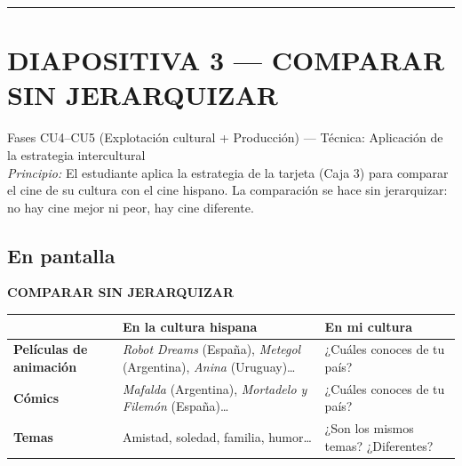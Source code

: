 \documentclass[a4paper,11pt]{article}
\begin{document}
\noindent\textcolor{violeta}{\rule{\linewidth}{2.5pt}}

\section*{DIAPOSITIVA 3 — COMPARAR SIN JERARQUIZAR}

{\small Fases CU4--CU5 (Explotación cultural + Producción) — Técnica: Aplicación de la estrategia intercultural}\\
{\small\textit{Principio:} El estudiante aplica la estrategia de la tarjeta (Caja 3) para comparar el cine de su cultura con el cine hispano. La comparación se hace sin jerarquizar: no hay cine mejor ni peor, hay cine diferente.}

\vspace{0.5cm}

\subsection*{En pantalla}

\begin{center}
{\Large\textbf{COMPARAR SIN JERARQUIZAR}}
\end{center}

\vspace{0.5cm}

\begin{center}
\renewcommand{\arraystretch}{1.6}
\begin{tabular}{|>{\raggedright\arraybackslash}p{3.5cm}|>{\raggedright\arraybackslash}p{5.5cm}|>{\raggedright\arraybackslash}p{5.5cm}|}
\hline
\rowcolor{violeta!15}
 & \textbf{\textcolor{violeta}{En la cultura hispana}} & \textbf{\textcolor{violeta}{En mi cultura}} \\
\hline
\textbf{Películas de animación} & \textit{Robot Dreams} (España), \textit{Metegol} (Argentina), \textit{Anina} (Uruguay)\ldots & ¿Cuáles conoces de tu país? \\
\hline
\textbf{Cómics} & \textit{Mafalda} (Argentina), \textit{Mortadelo y Filemón} (España)\ldots & ¿Cuáles conoces de tu país? \\
\hline
\textbf{Temas} & Amistad, soledad, familia, humor\ldots & ¿Son los mismos temas? ¿Diferentes? \\
\hline
\end{tabular}
\end{center}

\vspace{0.5cm}
\end{document}
